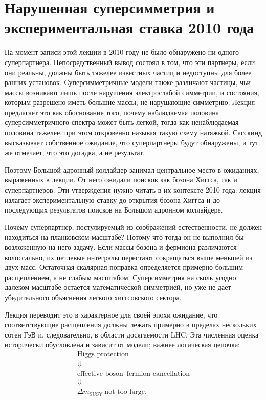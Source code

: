 \section{Нарушенная суперсимметрия и экспериментальная ставка 2010 года}

На момент записи этой лекции в 2010 году не было обнаружено ни одного суперпартнера. Непосредственный вывод состоял в том, что эти партнеры, если они реальны, должны быть тяжелее известных частиц и недоступны для более ранних установок. Суперсимметричные модели также различают частицы, чьи массы возникают лишь после нарушения электрослабой симметрии, и состояния, которым разрешено иметь большие массы, не нарушающие симметрию. Лекция предлагает это как обоснование того, почему наблюдаемая половина суперсимметричного спектра может быть легкой, тогда как ненаблюдаемая половина тяжелее, при этом откровенно называя такую схему натяжкой. Сасскинд высказывает собственное ожидание, что суперпартнеры будут обнаружены, и тут же отмечает, что это догадка, а не результат.

Поэтому Большой адронный коллайдер занимал центральное место в ожиданиях, выраженных в лекции. От него ожидали поисков как бозона Хиггса, так и суперпартнеров. Эти утверждения нужно читать в их контексте 2010 года: лекция излагает экспериментальную ставку до открытия бозона Хиггса и до последующих результатов поисков на Большом адронном коллайдере.

Почему суперпартнер, постулируемый из соображений естественности, не должен находиться на планковском масштабе? Потому что тогда он не выполнил бы возложенную на него задачу. Если массы бозона и фермиона различаются колоссально, их петлевые интегралы перестают сокращаться выше меньшей из двух масс. Остаточная скалярная поправка определяется примерно большим расщеплением, а не слабым масштабом. Суперсимметрия на сколь угодно далеком масштабе остается математической симметрией, но уже не дает убедительного объяснения легкого хиггсовского сектора.

Лекция переводит это в характерное для своей эпохи ожидание, что соответствующие расщепления должны лежать примерно в пределах нескольких сотен ГэВ и, следовательно, в области досягаемости LHC. Эта численная оценка исторически обусловлена и зависит от модели; важнее логическая цепочка:
\begin{equation}
\begin{gathered}
\text{Higgs protection}\\
\Downarrow\\
\text{effective boson--fermion cancellation}\\
\Downarrow\\
\Delta m_{\mathrm{SUSY}}\ \text{not too large}.
\end{gathered}
\end{equation}

